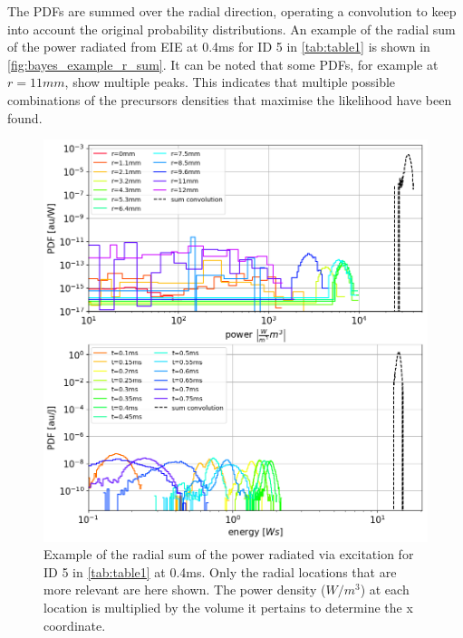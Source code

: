 The PDFs are summed over the radial direction, operating a convolution to keep into account the original probability distributions. An example of the radial sum of the power radiated from EIE at 0.4ms for ID 5 in \autoref{tab:table1} is shown in \autoref{fig:bayes_example_r_sum}. It can be noted that some PDFs, for example at $r=11mm$, show multiple peaks. This indicates that multiple possible combinations of the precursors densities that maximise the likelihood have been found.
\begin{figure}[!ht]
	\centering
	\includegraphics[width=0.9\linewidth,trim={0 332 0 0},clip]{Chapters/chapter3/figs/Bayesian_example_1.png}
	\caption{Example of the radial sum of the power radiated via excitation for ID 5 in \autoref{tab:table1} at 0.4ms. Only the radial locations that are more relevant are here shown. The power density ($W/m^3$) at each location is multiplied by the volume it pertains to determine the x coordinate.}
	\label{fig:bayes_example_r_sum}
\end{figure}

